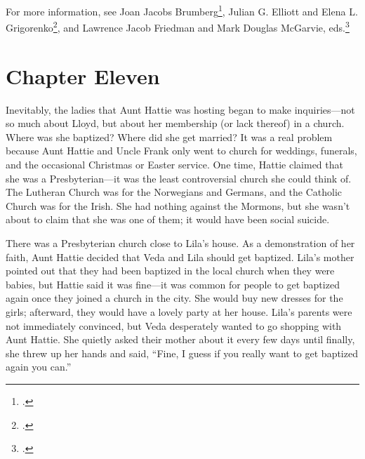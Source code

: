 \documentclass[
  letterpaper,
]{book}
\begin{document}
For more information, see Joan Jacobs Brumberg\footnote{.}, Julian G. Elliott and Elena L.
Grigorenko\footnote{.}, and Lawrence Jacob
Friedman and Mark Douglas McGarvie, eds.\footnote{.}


\chapter{Chapter Eleven}\label{chapter-eleven}

Inevitably, the ladies that Aunt Hattie was hosting began to make
inquiries---not so much about Lloyd, but about her membership (or lack
thereof) in a church. Where was she baptized? Where did she get married?
It was a real problem because Aunt Hattie and Uncle Frank only went to
church for weddings, funerals, and the occasional Christmas or Easter
service. One time, Hattie claimed that she was a Presbyterian---it was
the least controversial church she could think of. The Lutheran Church
was for the Norwegians and Germans, and the Catholic Church was for the
Irish. She had nothing against the Mormons, but she wasn't about to
claim that she was one of them; it would have been social suicide.

There was a Presbyterian church close to Lila's house. As a
demonstration of her faith, Aunt Hattie decided that Veda and Lila
should get baptized. Lila's mother pointed out that they had been
baptized in the local church when they were babies, but Hattie said it
was fine---it was common for people to get baptized again once they
joined a church in the city. She would buy new dresses for the girls;
afterward, they would have a lovely party at her house. Lila's parents
were not immediately convinced, but Veda desperately wanted to go
shopping with Aunt Hattie. She quietly asked their mother about it every
few days until finally, she threw up her hands and said, ``Fine, I guess
if you really want to get baptized again you can.''
\end{document}
